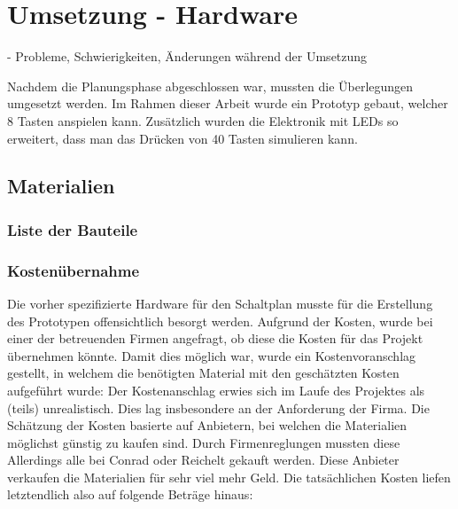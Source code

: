
\chapter{Umsetzung - Hardware} \label{umsetzungHW}

\nocite{*}
- Probleme, Schwierigkeiten, Änderungen während der Umsetzung

Nachdem die Planungsphase abgeschlossen war, mussten die Überlegungen umgesetzt werden.
Im Rahmen dieser Arbeit wurde ein Prototyp gebaut, welcher 8 Tasten anspielen kann.
Zusätzlich wurden die Elektronik mit LEDs so erweitert, dass man das Drücken von 40 Tasten simulieren kann.

\section{Materialien}
\subsection{Liste der Bauteile}
\subsection{Kostenübernahme}
Die vorher spezifizierte Hardware für den Schaltplan musste für die Erstellung des Prototypen offensichtlich besorgt werden.
Aufgrund der Kosten, wurde bei einer der betreuenden Firmen angefragt, ob diese die Kosten für das Projekt übernehmen
könnte.
Damit dies möglich war, wurde ein Kostenvoranschlag gestellt, in welchem die benötigten Material mit den geschätzten
Kosten aufgeführt wurde: \newline
Der Kostenanschlag erwies sich im Laufe des Projektes als (teils) unrealistisch. Dies lag insbesondere an der Anforderung
der Firma. Die Schätzung der Kosten basierte auf Anbietern, bei welchen die Materialien möglichst günstig zu kaufen sind.
Durch Firmenreglungen mussten diese Allerdings alle bei Conrad oder Reichelt
gekauft werden. Diese Anbieter verkaufen die Materialien für sehr viel mehr Geld. Die tatsächlichen Kosten liefen
letztendlich also auf folgende Beträge hinaus: \newline

